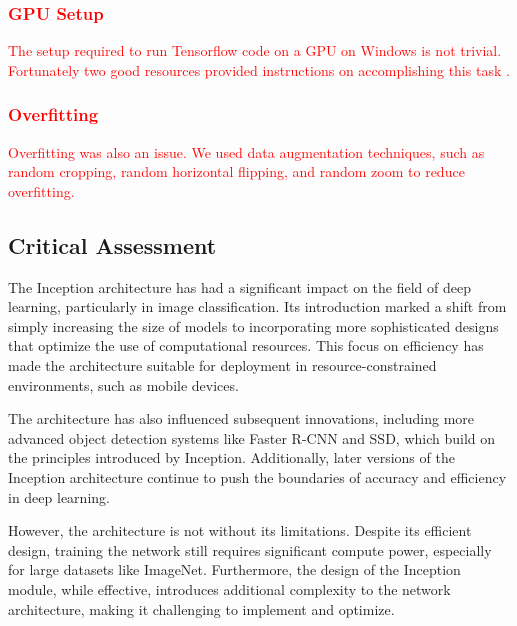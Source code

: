 \documentclass{article}
\begin{document}
\textcolor{red}{\subsubsection{GPU Setup}}
\textcolor{red}{The setup required to run Tensorflow code on a GPU on Windows is not trivial. Fortunately two good resources provided instructions on accomplishing this task \cite{abulhawa_tensorflow_gpu_wsl2_2023} \cite{towardsdatascience_jupyter_wsl2_2023}.}

\textcolor{red}{\subsubsection{Overfitting}}
\textcolor{red}{Overfitting was also an issue. We used data augmentation techniques, such as random cropping, random horizontal flipping, and random zoom to reduce overfitting\cite{dishasai_multiclass_classification}.}



\subsection{Critical Assessment}
The Inception architecture has had a significant impact on the field of deep learning, particularly in image classification. Its introduction marked a shift from simply increasing the size of models to incorporating more sophisticated designs that optimize the use of computational resources. This focus on efficiency has made the architecture suitable for deployment in resource-constrained environments, such as mobile devices.

The architecture has also influenced subsequent innovations, including more advanced object detection systems like Faster R-CNN and SSD, which build on the principles introduced by Inception. Additionally, later versions of the Inception architecture continue to push the boundaries of accuracy and efficiency in deep learning.

However, the architecture is not without its limitations. Despite its efficient design, training the network still requires significant compute power, especially for large datasets like ImageNet. Furthermore, the design of the Inception module, while effective, introduces additional complexity to the network architecture, making it  challenging to implement and optimize.
\end{document}
